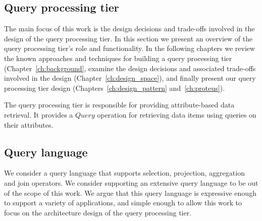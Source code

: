 \subsection{Query processing tier}
\label{subsec:query_prcessing_tier}
The main focus of this work is the design decisions and trade-offs involved in the design of the query processing tier.
In this section we present an overview of the query processing tier's role and functionality.
In the following chapters we review the known approaches and techniques for building a query processing tier (Chapter~\ref{ch:background},
examine the design decisions and associated trade-offs involved in the design (Chapter~\ref{ch:design_space}),
and finally present our query processing tier design (Chapters~\ref{ch:design_pattern} and~\ref{ch:proteus}).

The query processing tier is responsible for providing attribute-based data retrieval.
It provides a $Query$ operation for retrieving data items using queries on their attributes.


\subsection{Query language}

We consider a query language that supports selection, projection, aggregation and join operators.
We consider supporting an extensive query language to be out of the scope of this work.
We argue that this query language is expressive enough to support a variety of applications,
and simple enough to allow this work to focus on the architecture design of the query processing tier.

